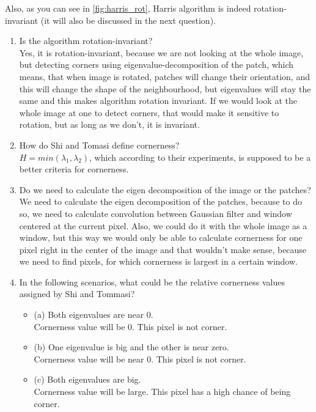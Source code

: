 \documentclass{article}
\begin{document}
Also, as you can see in \cref{fig:harris_rot}, Harris algorithm is indeed rotation-invariant (it will also be discussed in the next question).
\begin{enumerate}
    \item Is the algorithm rotation-invariant?\\
    Yes, it is rotation-invariant, because we are not looking at the whole image, but detecting corners using eigenvalue-decomposition of the patch, which means, that when image is rotated, patches will change their orientation, and this will change the shape of the neighbourhood, but eigenvalues will stay the same and this makes algorithm rotation invariant. If we would look at the whole image at one to detect corners, that would make it sensitive to rotation, but as long as we don't, it is invariant.
    
    \item How do Shi and Tomasi define cornerness?\\
    $H = min(\lambda_1, \lambda_2)$, which according to their experiments, is supposed to be a better criteria for cornerness.
    
    \item Do we need to calculate the eigen decomposition of the image or the patches?\\
    We need to calculate the eigen decomposition of the patches, because to do so, we need to calculate convolution between Gaussian filter and window centered at the current pixel. Also, we could do it with the whole image as a window, but this way we would only be able to calculate cornerness for one pixel right in the center of the image and that wouldn't make sense, because we need to find pixels, for which cornerness is largest in a certain window.
    
    \item In the following scenarios, what could be the relative cornerness values assigned by Shi and Tommasi?
    \begin{itemize}
        \item (a) Both eigenvalues are near 0.\\
        Cornerness value will be 0. This pixel is not corner.
        \item (b) One eigenvalue is big and the other is near zero.\\ Cornerness value will be near 0. This pixel is not corner.
        \item (c) Both eigenvalues are big.\\
        Cornerness value will be large. This pixel has a high chance of being corner.
    \end{itemize}
    
\end{enumerate}
\end{document}
